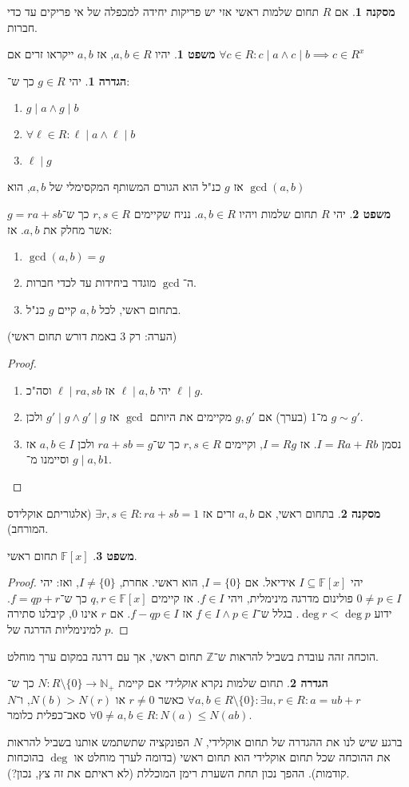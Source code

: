 \documentclass[a4paper]{article}
\newcommand\N     {\mathbb{N}}
\newcommand\Z     {\mathbb{Z}}
\newcommand\ml    {\ell}
\newcommand\F         {\mathbb{F}}
\newcommand\co        {\colon}
\theoremstyle{definition}
\newtheorem{Theorem}{\color{myblue}משפט}
\newtheorem{Definition}{\color{mygreen}הגדרה}
\newtheorem{Collary}{\color{mymagenta}מסקנה}
\newcommand\cola [1] {\begin{Collary}#1\end{Collary}}
\newcommand\theo  [1] {\begin{Theorem}#1\end{Theorem}}
\newcommand\defi  [1] {\begin{Definition}#1\end{Definition}}
\begin{document}
	\cola{אם $R$ תחום שלמות ראשי אזי יש פריקות יחידה למכפלה של אי פריקים עד כדי חברות. }
	
	\theo{יהיו $a, b \in R$, אז $a, b$ ייקראו זרים אם $\forall c \in R\co c \mid a \land c \mid b \implies c \in R^x$}
	\defi{יהי $g \in R$ כך ש־:
		\begin{enumerate}
			\item $g \mid a \land g \mid b$
			\item $\forall \ml \in R \co \ml \mid a \land \ml \mid b$
			\item $\ml \mid g$
		\end{enumerate}
		אז $g$ כנ"ל הוא הגורם המשותף המקסימלי של $a, b$, הוא $\gcd(a, b)$}
	
	\theo{יהי $R$ תחום שלמות ויהיו $a, b \in R$. נניח שקיימים $r, s \in R$ כך ש־$g = ra + sb$ אשר מחלק את $a, b$. אז: 
		\begin{enumerate}
			\item $\gcd(a, b) = g$
			\item ה־$\gcd$ מוגדר ביחידות עד לכדי חברות. 
			\item בתחום ראשי, לכל $a, b$ קיים $g$ כנ"ל. 
	\end{enumerate}}
	(הערה: רק 3 באמת דורש תחום ראשי)
	\begin{proof}\,
		\begin{enumerate}
			\item יהי $\ml \mid a, b$ אז $\ml \mid ra, sb$ וסה"כ $\ml \mid g$. 
			\item מ־1 (בערך) אם $g, g'$ מקיימים את היותם $\gcd$ אז $g' \mid g \land g' \mid g$ ולכן $g \sim g'$. 
			\item נסמן $I = Ra + Rb$. אז $I = Rg$, וקיימים $r, s \in R$ כך ש־$ra + sb = g$ ולכן $a, b \in I$ אז $g \mid a, b$ וסיימנו מ־$1$. 
		\end{enumerate}
	\end{proof}
	\cola{בתחום ראשי, אם $a, b$ זרים אז $\exists r, s \in R\co ra + sb = 1$ (אלגוריתם אוקלידס המורחב). }
	\theo{$\F[x]$ תחום ראשי. }
	\begin{proof}
		יהי $I \subseteq \F[x]$ אידיאל. אם $I = \{0\}$, הוא ראשי. אחרת, $I \neq \{0\}$, ואז: יהי $0 \neq p \in I$ פולינום מדרגה מינימלית, ויהי $f \in I$. אז קיימים $q, r \in \F[x]$ כך ש־$f = qp + r$. ידוע $\deg r < \deg p$. בגלל ש־$f \in I \land p \in I$ אז $f - qp \in I$. אם $r$ אינו $0$, קיבלנו סתירה למינימליות הדרגה של $p$. 
	\end{proof}
	הוכחה זהה עובדת בשביל להראות ש־$\Z$ תחום ראשי, אך עם דרגה במקום ערך מוחלט. 
	
	\defi{תחום שלמות נקרא \textit{אוקלידי} אם קיימת $N \co R \setminus \{0\} \to \N_+$ כך ש־$\forall a, b \in R\setminus \{0\} \co \exists u, r \in R \co a = ub + r$ כאשר $r \neq 0$ או $N(b) > N(r)$, ו־$N$ סאב־כפלית כלומר $\forall 0 \neq a, b \in R \co N(a) \le N(ab)$. }
	ברגע שיש לנו את ההגדרה של תחום אוקלידי, $N$ הפונקציה שתשתמש אותנו בשביל להראות את ההוכחה שכל תחום אוקלידי הוא תחום ראשי (בדומה לערך מוחלט או $\deg$ בהוכחות קודמות). ההפך נכון תחת השערת רימן המוכללת (לא ראיתם את זה צץ, נכון?). 
	
\end{document}
